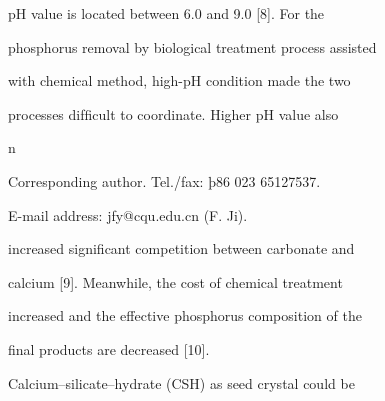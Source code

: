 \documentclass[a4paper,portrait,12pt]{article}
\begin{document}
\begin{flushleft}
pH value is located between 6.0 and 9.0 [8]. For the
\end{flushleft}


\begin{flushleft}
phosphorus removal by biological treatment process assisted
\end{flushleft}


\begin{flushleft}
with chemical method, high-pH condition made the two
\end{flushleft}


\begin{flushleft}
processes difﬁcult to coordinate. Higher pH value also
\end{flushleft}


\begin{flushleft}
n
\end{flushleft}





\begin{flushleft}
Corresponding author. Tel./fax: þ86 023 65127537.
\end{flushleft}


\begin{flushleft}
E-mail address: jfy@cqu.edu.cn (F. Ji).
\end{flushleft}





\begin{flushleft}
increased signiﬁcant competition between carbonate and
\end{flushleft}


\begin{flushleft}
calcium [9]. Meanwhile, the cost of chemical treatment
\end{flushleft}


\begin{flushleft}
increased and the effective phosphorus composition of the
\end{flushleft}


\begin{flushleft}
ﬁnal products are decreased [10].
\end{flushleft}


\begin{flushleft}
Calcium--silicate--hydrate (CSH) as seed crystal could be
\end{flushleft}
\end{document}
